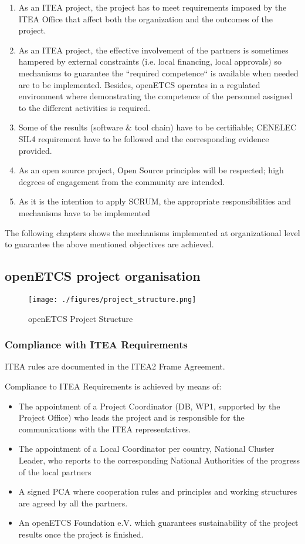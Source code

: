 \documentclass{template/openetcs_article}
\begin{document}
\begin{enumerate}
\item As an ITEA project, the project has to meet requirements imposed by the ITEA Office that affect both the organization and the outcomes of the project.
\item As an ITEA project, the effective involvement of the partners is sometimes hampered by external constraints (i.e. local financing, local approvals) so mechanisms to guarantee the “required competence“ is available when needed are to be implemented. Besides, openETCS operates in a regulated environment where demonstrating the competence of the personnel assigned to the different activities is required. 
\item Some of the results (software \& tool chain) have to be certifiable; CENELEC SIL4 requirement \citep{EN50128} have to be followed and the corresponding evidence provided. 
\item As an open source project, Open Source principles will be respected; high degrees of engagement from the community are intended.
\item As it is the intention to apply SCRUM, the appropriate responsibilities and mechanisms have to be implemented
\end{enumerate}

The following chapters shows the mechanisms implemented at organizational level to guarantee the above mentioned objectives are achieved.

\newpage
\subsection{openETCS project organisation}

\begin{figure}[H]
\centering
\texttt{[image: ./figures/project\_structure.png]}
\caption{openETCS Project Structure}
\end{figure}

\subsubsection{Compliance with ITEA Requirements}
ITEA rules are documented in the ITEA2 Frame Agreement.

Compliance to ITEA Requirements is achieved by means of:
\begin{itemize}
\item The appointment of a Project Coordinator (DB, WP1, supported by the Project Office) who leads the project and is responsible for the communications with the ITEA representatives. 
\item The appointment of a Local Coordinator per country, National Cluster Leader, who reports to the corresponding National Authorities of the progress of the local partners
\item A signed PCA where cooperation rules and principles and working structures are agreed by all the partners.
\item An openETCS Foundation e.V. which guarantees sustainability of the project results once the project is finished.
\end{itemize}
\end{document}
